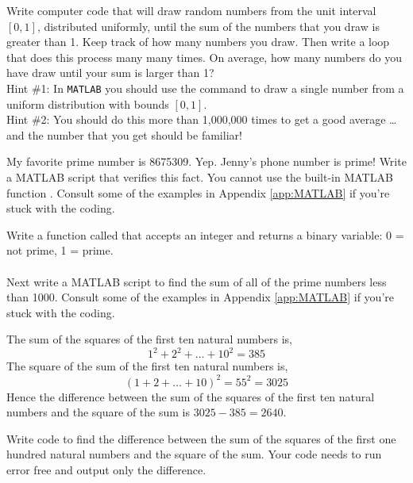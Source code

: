 \begin{problem}
    Write computer code that will draw random numbers from the unit interval $[0,1]$,
    distributed uniformly, until
    the sum of the numbers that you draw is greater than 1.  Keep track of how many
    numbers you draw.  Then write a loop that does this process many many times.  On
    average, how many numbers do you have draw until your sum is larger than 1? \\ Hint
    \#1:
    In \texttt{MATLAB} you should use the  command to draw a single
    number from a uniform distribution with bounds $[0,1]$. \\ Hint \#2: You should do
    this more than 1,000,000 times to get a good average \ldots and the number that you
    get should be familiar!
\end{problem}



\begin{problem}
    My favorite prime number is 8675309.  Yep.  Jenny's phone number is prime!  Write a
    MATLAB script that verifies this fact.  You cannot use the built-in MATLAB function
    .
    Consult some of the examples in Appendix \ref{app:MATLAB} if you're stuck with
    the coding.
\end{problem}

\begin{problem}
    Write a function called  that accepts an integer and returns a
    binary variable: 0 = not prime, 1 = prime.\\
     \\
    Next write a MATLAB script to find the sum of all of the prime numbers less than 1000.
    Consult some of the examples in Appendix \ref{app:MATLAB} if you're stuck with
    the coding.
\end{problem}




\begin{problem}
    The sum of the squares of the first ten natural numbers is,
    \[ 1^2 + 2^2 + \dots + 10^2 = 385 \]
    The square of the sum of the first ten natural numbers is,
    \[ (1 + 2 + \dots + 10)^2 = 55^2 = 3025 \]
    Hence the difference between the sum of the squares of the first ten natural numbers
    and the square of the sum is $3025 - 385 = 2640$.

    Write code to find the difference between the sum of the squares of the first one
    hundred natural numbers and the square of the sum.  Your code needs to run error free
    and output only the difference.  
\end{problem}

